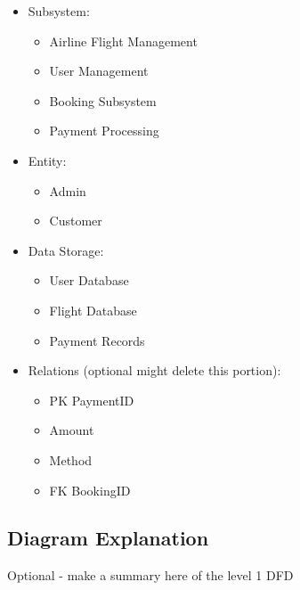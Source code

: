 \documentclass{article}
\begin{document}
\begin{itemize}
\begin{itemize}
\item Subsystem:
    \begin{itemize}
    \item Airline Flight Management
    \item User Management
    \item Booking Subsystem
    \item Payment Processing
    \end{itemize}
\item Entity:
    \begin{itemize}
    \item Admin
    \item Customer
    \end{itemize}
\item Data Storage:
    \begin{itemize}
    \item User Database
    \item Flight Database
    \item Payment Records
    \end{itemize}
\item Relations (optional might delete this portion):
    \begin{itemize}
    \item PK    PaymentID
    \item       Amount
    \item       Method
    \item FK    BookingID
    \end{itemize}
\end{itemize}

\subsection{Diagram Explanation}

Optional - make a summary here of the level 1 DFD


\end{itemize}
\end{document}
